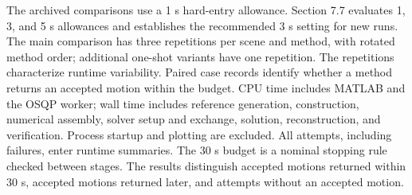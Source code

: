 The archived comparisons use a 1 s hard-entry allowance. Section 7.7 evaluates 1, 3, and 5 s allowances and establishes the recommended 3 s setting for new runs. The main comparison has three repetitions per scene and method, with rotated method order; additional one-shot variants have one repetition. The repetitions characterize runtime variability. Paired case records identify whether a method returns an accepted motion within the budget. CPU time includes MATLAB and the OSQP worker; wall time includes reference generation, construction, numerical assembly, solver setup and exchange, solution, reconstruction, and verification. Process startup and plotting are excluded. All attempts, including failures, enter runtime summaries. The 30 s budget is a nominal stopping rule checked between stages. The results distinguish accepted motions returned within 30 s, accepted motions returned later, and attempts without an accepted motion.


